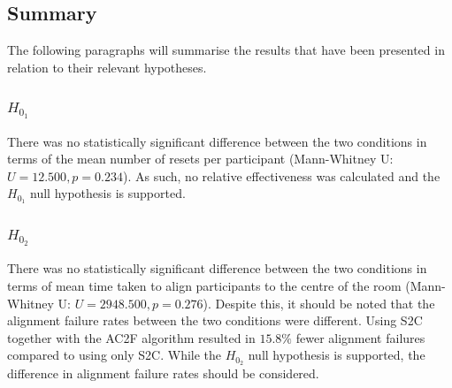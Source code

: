 \subsection{Summary}
The following paragraphs will summarise the results that have been presented in relation to their relevant hypotheses.  

\subsubsection{$H_{0_1}$}
There was no statistically significant difference between the two conditions in terms of the mean number of resets per participant (Mann-Whitney U: $U = 12.500, p = 0.234$). As such, no relative effectiveness was calculated and the $H_{0_1}$ null hypothesis is supported.

\subsubsection{$H_{0_2}$}
There was no statistically significant difference between the two conditions in terms of mean time taken to align participants to the centre of the room (Mann-Whitney U: $U = 2948.500, p = 0.276$). Despite this, it should be noted that the alignment failure rates between the two conditions were different. Using S2C together with the AC2F algorithm resulted in $15.8\%$ fewer alignment failures compared to using only S2C. While the $H_{0_2}$ null hypothesis is supported, the difference in alignment failure rates should be considered.